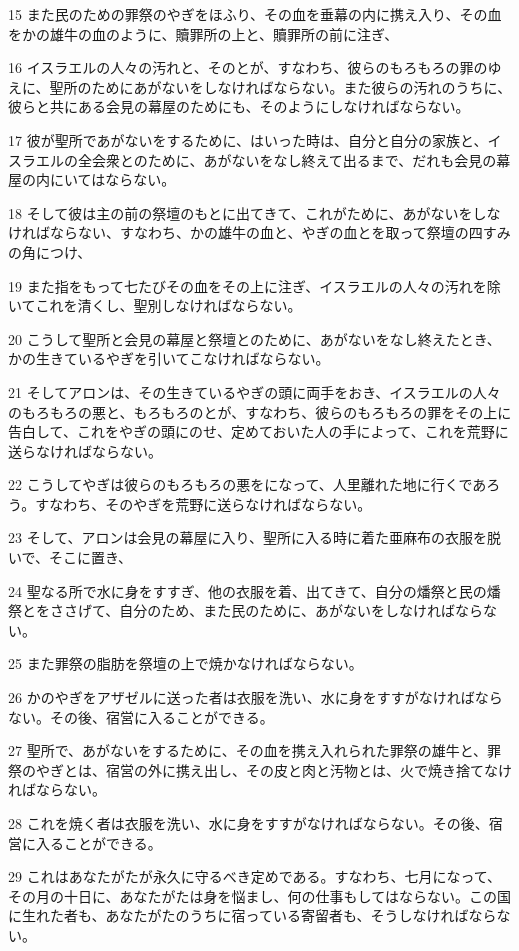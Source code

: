 \par 15 また民のための罪祭のやぎをほふり、その血を垂幕の内に携え入り、その血をかの雄牛の血のように、贖罪所の上と、贖罪所の前に注ぎ、
\par 16 イスラエルの人々の汚れと、そのとが、すなわち、彼らのもろもろの罪のゆえに、聖所のためにあがないをしなければならない。また彼らの汚れのうちに、彼らと共にある会見の幕屋のためにも、そのようにしなければならない。
\par 17 彼が聖所であがないをするために、はいった時は、自分と自分の家族と、イスラエルの全会衆とのために、あがないをなし終えて出るまで、だれも会見の幕屋の内にいてはならない。
\par 18 そして彼は主の前の祭壇のもとに出てきて、これがために、あがないをしなければならない、すなわち、かの雄牛の血と、やぎの血とを取って祭壇の四すみの角につけ、
\par 19 また指をもって七たびその血をその上に注ぎ、イスラエルの人々の汚れを除いてこれを清くし、聖別しなければならない。
\par 20 こうして聖所と会見の幕屋と祭壇とのために、あがないをなし終えたとき、かの生きているやぎを引いてこなければならない。
\par 21 そしてアロンは、その生きているやぎの頭に両手をおき、イスラエルの人々のもろもろの悪と、もろもろのとが、すなわち、彼らのもろもろの罪をその上に告白して、これをやぎの頭にのせ、定めておいた人の手によって、これを荒野に送らなければならない。
\par 22 こうしてやぎは彼らのもろもろの悪をになって、人里離れた地に行くであろう。すなわち、そのやぎを荒野に送らなければならない。
\par 23 そして、アロンは会見の幕屋に入り、聖所に入る時に着た亜麻布の衣服を脱いで、そこに置き、
\par 24 聖なる所で水に身をすすぎ、他の衣服を着、出てきて、自分の燔祭と民の燔祭とをささげて、自分のため、また民のために、あがないをしなければならない。
\par 25 また罪祭の脂肪を祭壇の上で焼かなければならない。
\par 26 かのやぎをアザゼルに送った者は衣服を洗い、水に身をすすがなければならない。その後、宿営に入ることができる。
\par 27 聖所で、あがないをするために、その血を携え入れられた罪祭の雄牛と、罪祭のやぎとは、宿営の外に携え出し、その皮と肉と汚物とは、火で焼き捨てなければならない。
\par 28 これを焼く者は衣服を洗い、水に身をすすがなければならない。その後、宿営に入ることができる。
\par 29 これはあなたがたが永久に守るべき定めである。すなわち、七月になって、その月の十日に、あなたがたは身を悩まし、何の仕事もしてはならない。この国に生れた者も、あなたがたのうちに宿っている寄留者も、そうしなければならない。
